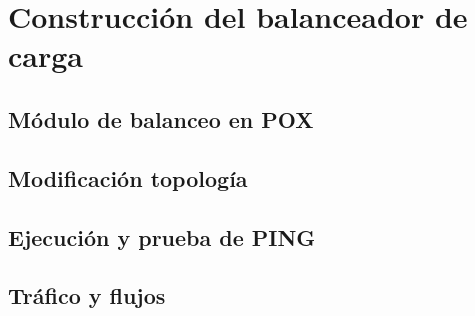 \documentclass{article}
\begin{document}
\section{Construcción del balanceador de carga}

\subsection{Módulo de balanceo en POX}

\subsection{Modificación topología}

\subsection{Ejecución y prueba de PING}

\subsection{Tráfico y flujos}


\begin{thebibliography}{99}


\end{thebibliography}
\end{document}
